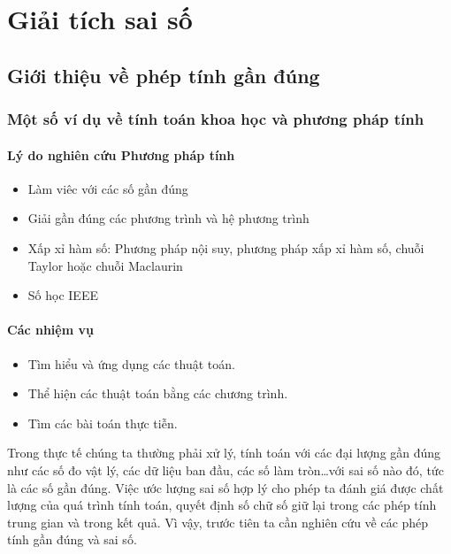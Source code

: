 \documentclass[../../Lectures.tex]{subfiles}
\begin{document}
\chapter{Giải tích sai số}

\section{Giới thiệu về phép tính gần đúng}

\subsection{Một số ví dụ về tính toán khoa học và phương pháp tính}

\subsubsection{Lý do nghiên cứu Phương pháp tính}

\begin{itemize}
    \item Làm viêc với các số gần đúng
    \item Giải gần đúng các phương trình và hệ phương trình
    \item Xấp xỉ hàm số: Phương pháp nội suy, phương pháp xấp xỉ hàm số, chuỗi
        Taylor hoặc chuỗi Maclaurin
    \item Số học IEEE    %
\end{itemize}

\subsubsection{Các nhiệm vụ}

\begin{itemize}
    \item Tìm hiểu và ứng dụng các thuật toán.
    \item Thể hiện các thuật toán bằng các chương trình.
    \item Tìm các bài toán thực tiễn.
\end{itemize}

Trong thực tế chúng ta thường phải xử lý, tính toán với các đại lượng gần đúng
như các số đo vật lý, các dữ liệu ban đầu, các số làm tròn…với sai số nào đó,
tức là các số gần đúng. Việc ước lượng sai số hợp lý cho phép ta đánh giá được
chất lượng của quá trình tính toán, quyết định số chữ số giữ lại trong các phép
tính trung gian và trong kết quả. Vì vậy, trước tiên ta cần nghiên cứu về các
phép tính gần đúng và sai số.
\end{document}
